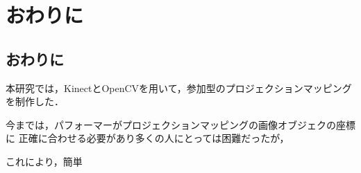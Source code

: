 \chapter{おわりに}
\thispagestyle{fancy}

\section{おわりに}

本研究では，KinectとOpenCVを用いて，参加型のプロジェクションマッピングを制作した．

今までは，パフォーマーがプロジェクションマッピングの画像オブジェクの座標に
正確に合わせる必要があり多くの人にとっては困難だったが，



これにより，簡単
